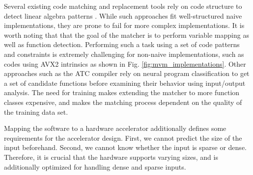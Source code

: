 \documentclass[manuscript,screen,review]{acmart}
\begin{document}
Several existing code matching and replacement tools rely on code structure to detect linear algebra patterns \cite{kernelfarer, IDL}. While such approaches fit well-structured naive implementations, they are prone to fail for more complex implementations. It is worth noting that that the goal of the matcher is to perform variable mapping as well as function detection. Performing such a task using a set of code patterns and constraints is extremely challenging for non-naive implementations, such as codes using AVX2 intrinsics as shown in Fig. \ref{fig:mvm_implementations}. Other approaches such as the ATC compiler \cite{ATC} rely on neural program classification \cite{cummins2021a} to get a set of candidate functions before examining their behavior using input/output analysis. The need for training makes extending the matcher to more function classes expensive, and makes the matching process dependent on the quality of the training data set.

Mapping the software to a hardware accelerator additionally defines some requirements for the accelerator design. First, we cannot predict the size of the input beforehand. Second, we cannot know whether the input is sparse or dense. Therefore, it is crucial that the hardware supports varying sizes, and is additionally optimized for handling dense and sparse inputs. 
\end{document}
